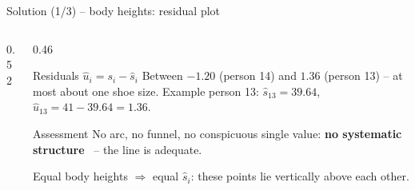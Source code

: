 \documentclass[aspectratio=169,11pt]{beamer}
\def\heightreslist{38.7557/0.2443,38.3113/-0.3113,39.6445/-0.6445,46.3105/-0.3105,39.2001/0.7999,39.2001/-0.2001,44.9773/0.0227,37.8669/-0.8669,35.8671/0.1329,41.1999/0.8001,42.3109/0.6891,37.8669/0.1331,39.6445/1.3555,41.1999/-1.1999,39.6445/-0.6445}
\newcommand{\residualplotof}[1]{%
  \foreach \px/\py in #1 {%
    \edef\tmpdraw{\noexpand\draw[hsbirot!70, line width=1.2pt] (axis cs:\px,0) -- (axis cs:\px,\py);
      \noexpand\fill[hsbiblau] (axis cs:\px,\py) circle[radius=2.2pt];}%
    \tmpdraw
  }}
\begin{document}
\begin{frame}{Solution (1/3) -- body heights: residual plot}
  \begin{columns}[T]
    \begin{column}{0.52\textwidth}
    \end{column}
    \begin{column}{0.46\textwidth}
      \small
      \begin{block}{Residuals $\hat{u}_i = s_i - \hat{s}_i$}
        Between $-1.20$ (person 14) and $1.36$ (person 13) -- at most about
        one shoe size. Example person 13: $\hat{s}_{13} = 39.64$,
        $\hat{u}_{13} = 41 - 39.64 = 1.36$.
      \end{block}
      \begin{exampleblock}{Assessment}
        No arc, no funnel, no conspicuous single value:
        \textbf{no systematic structure} \checkmark\ -- the line is adequate.
      \end{exampleblock}
      \footnotesize Equal body heights $\Rightarrow$ equal $\hat{s}_i$: these
      points lie vertically above each other.
    \end{column}
  \end{columns}
\end{frame}
\end{document}
